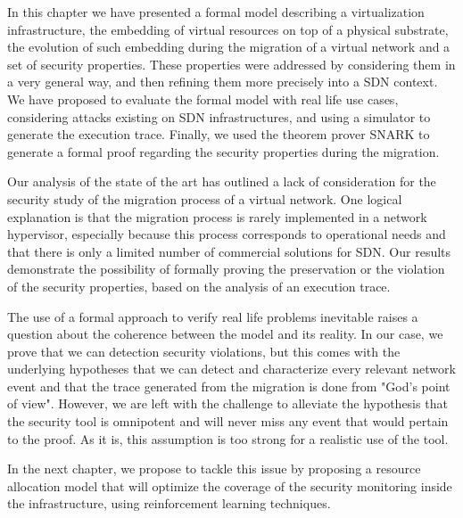 In this chapter we have presented a formal model describing a virtualization infrastructure, the embedding of virtual resources on top of a physical substrate, the evolution of such embedding during the migration of a virtual network and a set of security properties. These properties were addressed by considering them in a very general way, and then refining them more precisely into a SDN context. We have proposed to evaluate the formal model with real life use cases, considering attacks existing on SDN infrastructures, and using a simulator to generate the execution trace. Finally, we used the theorem prover SNARK to generate a formal proof regarding the security properties during the migration.

Our analysis of the state of the art has outlined a lack of consideration for the security study of the migration process of a virtual network.
One logical explanation is that the migration process is rarely implemented in a network hypervisor, especially because this process corresponds to operational needs and that there is only a limited number of commercial solutions for SDN.
Our results demonstrate the possibility of formally proving the preservation or the violation of the security properties, based on the analysis of an execution trace.

The use of a formal approach to verify real life problems inevitable raises a question about the coherence between the model and its reality.
In our case, we prove that we can detection security violations, but this comes with the underlying hypotheses that we can detect and characterize every relevant network event and that the trace generated from the migration is done from "God's point of view". However, we are left with the challenge to alleviate the hypothesis that the security tool is omnipotent and will never miss any event that would pertain to the proof. As it is, this assumption is too strong for a realistic use of the tool.

In the next chapter, we propose to tackle this issue by proposing a resource allocation model that will optimize the coverage of the security monitoring inside the infrastructure, using reinforcement learning techniques.